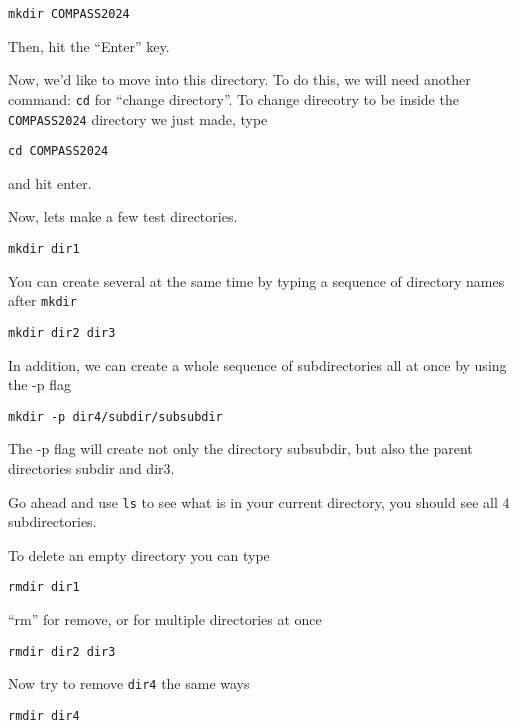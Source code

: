 \documentclass[aps,showpacs,prd,notitlepage,preprintnumbers,amsmath,amssymb,letterpaper]{revtex4}
\begin{document}
\begin{verbatim}
mkdir COMPASS2024
\end{verbatim}

Then, hit the ``Enter'' key.

Now, we'd like to move into this directory. To do this, we will need another command: \verb|cd| for ``change directory''.
To change direcotry to be inside the \verb|COMPASS2024| directory we just made, type

\begin{verbatim}
cd COMPASS2024
\end{verbatim}

and hit enter.

Now, lets make a few test directories.

\begin{verbatim}
mkdir dir1
\end{verbatim}

You can create several at the same time by typing a sequence of directory names after \verb|mkdir|

\begin{verbatim}
mkdir dir2 dir3
\end{verbatim}

In addition, we can create a whole sequence of subdirectories all at once by using the -p flag

\begin{verbatim}
mkdir -p dir4/subdir/subsubdir
\end{verbatim}

The -p flag will create not only the directory subsubdir, but also the parent directories subdir and dir3.

Go ahead and use \verb|ls| to see what is in your current directory, you should see all 4 subdirectories.

To delete an empty directory you can type

\begin{verbatim}
rmdir dir1
\end{verbatim}

``rm'' for remove, or for multiple directories at once

\begin{verbatim}
rmdir dir2 dir3
\end{verbatim}

Now try to remove \verb|dir4| the same ways

\begin{verbatim}
rmdir dir4
\end{verbatim}
\end{document}
